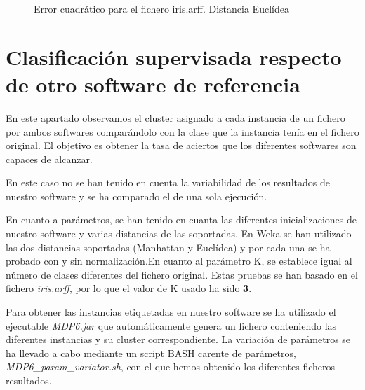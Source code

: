 \documentclass[a4paper]{report}
\begin{document}
	
	\begin{figure}[htbp]
	\begin{center}
	\end{center}
	\caption{Error cuadrático para el fichero iris.arff. Distancia Euclídea}
	\label{rescompiris}
	\end{figure}
	

	
	
	\FloatBarrier
	\section{Clasificación supervisada respecto de otro software de referencia}
	\label{resprecision}
	En este apartado observamos el cluster asignado a cada instancia de un fichero por ambos softwares comparándolo con la clase que la instancia tenía en el fichero original. El objetivo es obtener la tasa de aciertos que los diferentes softwares son capaces de alcanzar.
	
	En este caso no se han tenido en cuenta la variabilidad de los resultados de nuestro software y se ha comparado el de una sola ejecución.
	
	En cuanto a parámetros, se han tenido en cuanta las diferentes inicializaciones de nuestro software y varias distancias de las soportadas. En Weka se han utilizado las dos distancias soportadas (Manhattan y Euclídea) y por cada una se ha probado con y sin normalización.En cuanto al parámetro K, se establece igual al número de clases diferentes del fichero original. Estas pruebas se han basado en el fichero \textit{iris.arff}, por lo que el valor de K usado ha sido \textbf{3}.
	
	Para obtener las instancias etiquetadas en nuestro software se ha utilizado el ejecutable \textit{MDP6.jar} que automáticamente genera un fichero conteniendo las diferentes instancias y su cluster correspondiente. La variación de parámetros se ha llevado a cabo mediante un script BASH carente de parámetros, \textit{MDP6\_param\_variator.sh},  con el que hemos obtenido los diferentes ficheros resultados.
	
\end{document}
